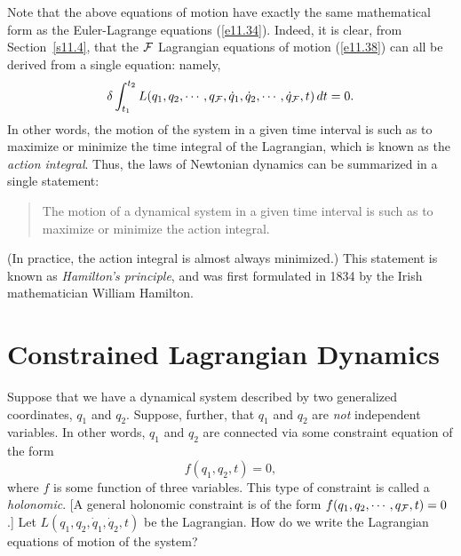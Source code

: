 Note that the above equations of motion have exactly the same mathematical form as the Euler-Lagrange equations (\ref{e11.34}). Indeed, it is clear, from Section~\ref{s11.4}, that the ${\cal F}$ Lagrangian equations of motion (\ref{e11.38})
can all be derived from a single equation: namely,
\begin{equation}
\delta\int_{t_1}^{t_2} L(q_1,q_2,\cdots,q_{\cal F}, \dot{q}_1,\dot{q}_2,\cdots,\dot{q}_{\cal F},t)\,dt = 0.
\end{equation}
In other words, the motion of the system in a given time interval is such as to maximize or
minimize the time integral of the Lagrangian, which is known as the
{\em action integral}. Thus,  the laws of Newtonian dynamics can be summarized in a
single statement:
\begin{quote}
 The motion of a dynamical
system in a given time interval is such as to maximize or minimize the action integral. 
\end{quote}
(In practice, the action integral is almost always minimized.) This statement is known as {\em Hamilton's principle}, and was first formulated in 1834 by the Irish
mathematician William Hamilton.

\section{Constrained Lagrangian Dynamics}
Suppose that we have a dynamical system described by two generalized
coordinates, $q_1$ and $q_2$. Suppose, further, that $q_1$ and $q_2$ are
{\em not}\/ independent variables. In other words, $q_1$ and $q_2$ are connected
via some constraint equation of the form
\begin{equation}\label{e11.40}
f(q_1,q_2,t) = 0,
\end{equation}
where $f$ is some function of three variables.
This type of constraint is called a {\em holonomic}. [A general
holonomic constraint is of the form $f(q_1,q_2,\cdots,q_{\cal F},t)=0$.]
Let $L(q_1,q_2,\dot{q}_1,\dot{q}_2,t)$ be the  Lagrangian.
How do we write the Lagrangian equations of motion of the system?

